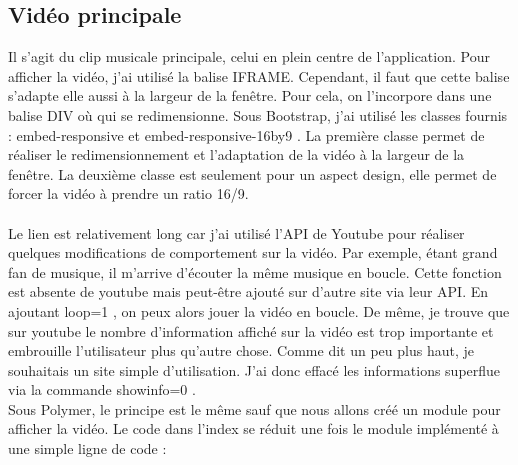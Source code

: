 \documentclass{article}
\begin{document}
\subsection{Vid\'eo principale}

Il s'agit du clip musicale principale, celui en plein centre de l'application. Pour afficher la vid\'eo, j'ai utilis\'e la balise IFRAME. Cependant, il faut que cette balise s'adapte elle aussi \`a la largeur de la fen\^etre. Pour cela, on l'incorpore dans une balise DIV o\`u qui se redimensionne. Sous Bootstrap, j'ai utilis\'e les classes fournis : \og embed-responsive \fg{} et \og embed-responsive-16by9 \fg{}. La premi\`ere classe permet de r\'ealiser le redimensionnement et l'adaptation de la vid\'eo \`a la largeur de la fen\^etre. La deuxi\`eme classe est seulement pour un aspect design, elle permet de forcer la vid\'eo \`a prendre un ratio 16/9.
\vspace{0.5cm}\\
\vspace{0.5cm}\\
Le lien est relativement long car j'ai utilis\'e l'API de Youtube pour r\'ealiser quelques modifications de comportement sur la vid\'eo. Par exemple, \'etant grand fan de musique, il m'arrive d'\'ecouter la m\^eme musique en boucle. Cette fonction est absente de youtube mais peut-\^etre ajout\'e sur d'autre site via leur API. En ajoutant \og loop=1 \fg{}, on peux alors jouer la vid\'eo en boucle. De m\^eme, je trouve que sur youtube le nombre d'information affich\'e sur la vid\'eo est trop importante et embrouille l'utilisateur plus qu'autre chose. Comme dit un peu plus haut, je souhaitais un site simple d'utilisation. J'ai donc effac\'e les informations superflue via la commande \og showinfo=0 \fg{}.  
\vspace{0.5cm}\\
Sous Polymer, le principe est le m\^eme sauf que nous allons cr\'e\'e un module pour afficher la vid\'eo. Le code dans l'index se r\'eduit une fois le module impl\'ement\'e \`a une simple ligne de code :
\vspace{0.5cm}\\
\end{document}
